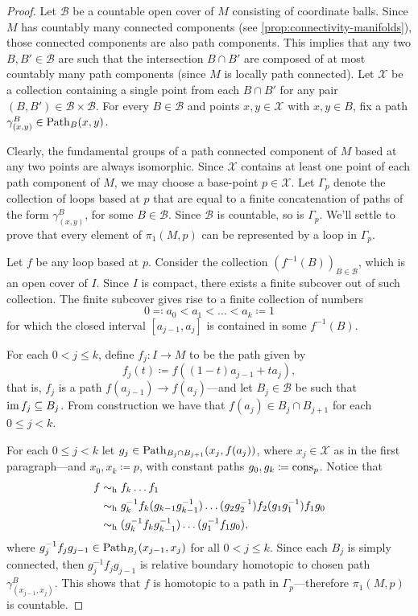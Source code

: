\begin{proof}
Let \(\mathcal{B}\) be a countable open cover of \(M\) consisting of coordinate
balls. Since \(M\) has countably many connected components (see
\cref{prop:connectivity-manifolds}), those connected components are also path
components. This implies that any two \(B, B' \in \mathcal{B}\) are such that
the intersection \(B \cap B'\) are composed of at most countably many path
components (since \(M\) is locally path connected). Let \(\mathcal{X}\) be a
collection containing a single point from each \(B \cap B'\) for any pair
\((B, B') \in \mathcal{B} \times \mathcal{B}\). For every \(B \in \mathcal{B}\)
and points \(x, y \in \mathcal{X}\) with \(x, y \in B\), fix a path
\(\gamma_{(x, y)}^B \in \operatorname{Path}_B(x, y)\).

Clearly, the fundamental groups of a path connected component of \(M\) based at
any two points are always isomorphic. Since \(\mathcal{X}\) contains at least
one point of each path component of \(M\), we may choose a base-point
\(p \in \mathcal{X}\). Let \(\Gamma_p\) denote the collection of loops based at
\(p\) that are equal to a finite concatenation of paths of the form
\(\gamma_{(x, y)}^B\), for some \(B \in \mathcal{B}\). Since \(\mathcal{B}\) is
countable, so is \(\Gamma_p\). We'll settle to prove that every element of
\(\pi_1(M, p)\) can be represented by a loop in \(\Gamma_p\).

Let \(f\) be any loop based at \(p\). Consider the collection
\((f^{-1}(B))_{B \in \mathcal{B}}\), which is an open cover of \(I\). Since
\(I\) is compact, there exists a finite subcover out of such collection. The
finite subcover gives rise to a finite collection of numbers
\[
0 \eqqcolon a_0 < a_1 < \dots < a_k \coloneq 1
\]
for which the closed interval \([a_{j-1}, a_j]\) is contained in some
\(f^{-1}(B)\).

For each \(0 < j \leq k\), define \(f_j: I \to M\) to be the path given by
\[
f_j(t) \coloneq f((1 - t) a_{j-1} + t a_j),
\]
that is, \(f_j\) is a path \(f(a_{j-1}) \to f(a_j)\)---and let
\(B_j \in \mathcal{B}\) be such that \(\operatorname{im} f_j \subseteq B_j\). From
construction we have that \(f(a_j) \in B_j \cap B_{j+1}\) for each
\(0 \leq j < k\).

For each \(0 \leq j < k\) let \(g_j \in \operatorname{Path}_{B_j \cap B_{j+1}}(x_j, f(a_j))\),
where \(x_j \in \mathcal{X}\) as in the first paragraph---and \(x_0, x_k
\coloneq p\), with constant paths \(g_0, g_k \coloneq \operatorname{cons}_p\). Notice that
\begin{align*}
f &\sim_{\text{h}} f_k \dots f_1 \\
  &\sim_{\text{h}} g_k^{-1} f_k (g_{k-1} g_{k-1}^{-1}) \dots (g_2 g_2^{-1}) f_2 (g_1 g_1^{-1})
    f_1 g_0 \\
  &\sim_{\text{h}} (g_k^{-1} f_k  g_{k-1}^{-1}) \dots (g_1^{-1} f_1 g_0), \\
\end{align*}
where \(g_j^{-1} f_j g_{j-1} \in \operatorname{Path}_{B_j}(x_{j-1}, x_j)\) for all
\(0 < j \leq k\). Since each \(B_j\) is simply connected, then
\(g_j^{-1} f_j g_{j-1}\) is relative boundary homotopic to chosen path
\(\gamma_{(x_{j-1}, x_j)}^B\). This shows that \(f\) is homotopic to a path in
\(\Gamma_p\)---therefore \(\pi_1(M, p)\) is countable.
\end{proof}

